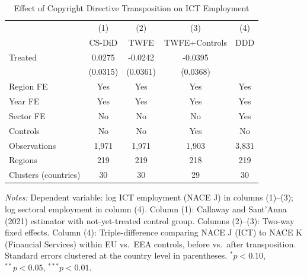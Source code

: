 \begin{table}[htbp]
\centering
\caption{Effect of Copyright Directive Transposition on ICT Employment}
\label{tab:main}
\begin{tabular}{lcccc}
\toprule
& (1) & (2) & (3) & (4) \\
& CS-DiD & TWFE & TWFE+Controls & DDD \\
\midrule
 Treated & 0.0275 & -0.0242 & -0.0395 & \\
& (0.0315) & (0.0361) & (0.0368) & \\[0.5em]
  \midrule
Region FE & Yes & Yes & Yes & Yes \\
Year FE & Yes & Yes & Yes & Yes \\
Sector FE & No & No & No & Yes \\
Controls & No & No & Yes & No \\
Observations & 1,971 & 1,971 & 1,903 & 3,831 \\
Regions & 219 & 219 & 218 & 219 \\
Clusters (countries) & 30 & 30 & 29 & 30 \\
\bottomrule
\end{tabular}
 \begin{tablenotes}
\small
\item \textit{Notes:} Dependent variable: log ICT employment (NACE J) in columns (1)--(3); log sectoral employment in column (4). Column (1): Callaway and Sant'Anna (2021) estimator with not-yet-treated control group. Columns (2)--(3): Two-way fixed effects. Column (4): Triple-difference comparing NACE J (ICT) to NACE K (Financial Services) within EU vs.\ EEA controls, before vs.\ after transposition. Standard errors clustered at the country level in parentheses. $^{*}p<0.10$, $^{**}p<0.05$, $^{***}p<0.01$.
\end{tablenotes}
\end{table}
